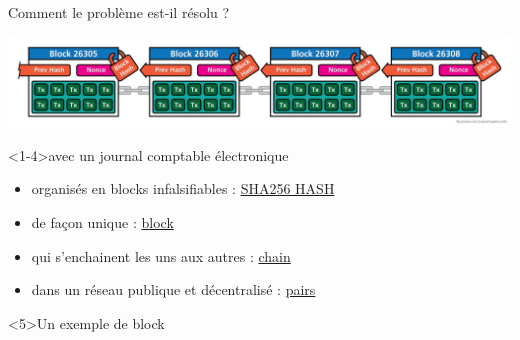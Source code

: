 \documentclass[presentation]{beamer}
\begin{document}
\begin{frame}[label={sec:org3d80ae3}]{Comment le problème est-il résolu ?}
\begin{center}
\includegraphics[width=\textwidth]{Pictures/cryptographics/anatomy-of-a-chain-1.png}
\end{center}
\begin{block}<1-4>{avec un journal comptable électronique}
\begin{itemize}
\item <1>organisés en blocks \alert{infalsifiables} : \href{https://andersbrownworth.com/blockchain/hash}{SHA256 HASH}
\item <2>de façon unique : \href{https://andersbrownworth.com/blockchain/block}{block}
\item <3>qui s'\alert{enchainent} les uns aux autres : \href{https://andersbrownworth.com/blockchain/blockchain}{chain}
\item <4>dans un réseau \alert{publique et décentralisé} : \href{https://andersbrownworth.com/blockchain/distributed}{pairs}
\end{itemize}
\end{block}

\begin{block}<5>{Un exemple de block}
\end{block}
\end{frame}
\end{document}
